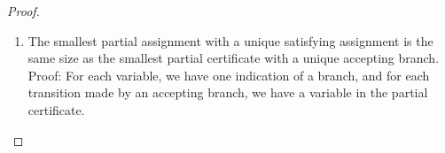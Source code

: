 \documentclass[runningheads,a4paper]{llncs}
\begin{document}
\begin{proof}
\begin{enumerate}
Proof: This follows from $14$ and the fact that each assignment of the variables corresponds bijectively with a branch of the computation of $M$. 
\item The smallest partial assignment with a unique satisfying assignment is the same size as the smallest partial certificate with a unique accepting branch.\\
Proof: For each variable, we have one indication of a branch, and for each transition made by an accepting branch, we have a variable in the partial certificate. 
\end{enumerate}

\end{proof}

\end{document}
